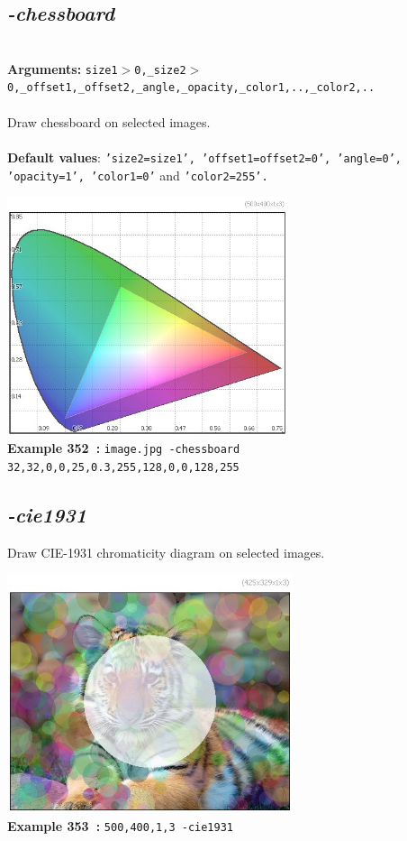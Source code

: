 \documentclass[a4paper,11pt,twoside]{book}
\begin{document}
\subsection{\emph{-chessboard} }\vspace*{-0.5em}
~\\\textbf{Arguments: } 
{\small \texttt{size1$>$0,\_size2$>$0,\_offset1,\_offset2,\_angle,\_opacity,\_color1,..,\_color2,..}}\\~\\
Draw chessboard on selected images.
~\\~\\\textbf{Default values}: {\small \texttt{'size2=size1', 'offset1=offset2=0', 'angle=0', 'opacity=1', 'color1=0'} and \texttt{'color2=255'.}}
\begin{center}\includegraphics[keepaspectratio=true,height=7cm,width=\textwidth]{img/gmic_def352.jpg}\\
{\footnotesize \textbf{Example 352~:} \texttt{image.jpg -chessboard 32,32,0,0,25,0.3,255,128,0,0,128,255}}
\end{center}

\subsection{\emph{-cie1931} }\vspace*{-0.5em}
Draw CIE-1931 chromaticity diagram on selected images.
\begin{center}\includegraphics[keepaspectratio=true,height=7cm,width=\textwidth]{img/gmic_def353.jpg}\\
{\footnotesize \textbf{Example 353~:} \texttt{500,400,1,3 -cie1931}}
\end{center}
\end{document}
